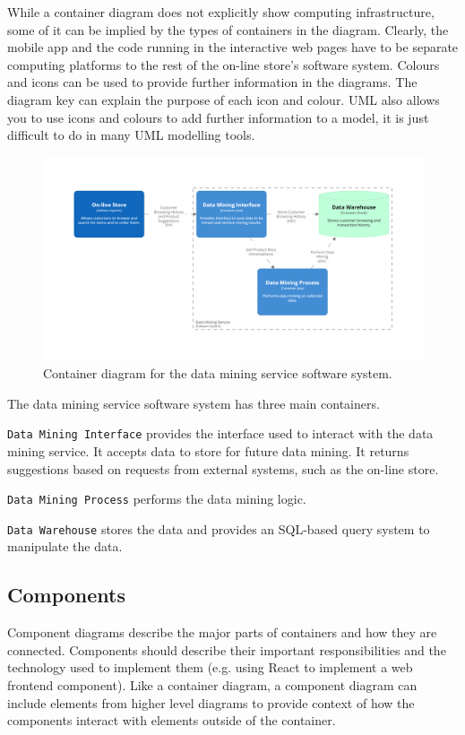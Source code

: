\noindent
While a container diagram does not explicitly show computing infrastructure, some of it can be implied by the types of containers in the diagram.
Clearly, the mobile app and the code running in the interactive web pages have to be separate computing platforms to the rest of the on-line store's software system.
Colours and icons can be used to provide further information in the diagrams.
The diagram key can explain the purpose of each icon and colour.
UML also allows you to use icons and colours to add further information to a model, it is just difficult to do in many UML modelling tools.

\begin{figure}[h]
    \centering
    \begin{adjustwidth}{-5mm}{-5mm}
        \includegraphics[trim=185 185 185 185,clip,width=0.92\paperwidth]{images/c4/datamining_container_diagram.png}
    \end{adjustwidth}
    \caption{Container diagram for the data mining service software system.}
    \label{fig:c4_container_datamining}
\end{figure}

\noindent
The data mining service software system has three main containers.

\texttt{Data Mining Interface} provides the interface used to interact with the data mining service.
It accepts data to store for future data mining.
It returns suggestions based on requests from external systems, such as the on-line store.

\texttt{Data Mining Process} performs the data mining logic.

\texttt{Data Warehouse} stores the data and provides an SQL-based query system to manipulate the data.

\subsection{Components}
Component diagrams describe the major parts of containers and how they are connected.
Components should describe their important responsibilities and the technology used to implement them
(e.g. using React to implement a web frontend component).
Like a container diagram, a component diagram can include elements from higher level diagrams
to provide context of how the components interact with elements outside of the container.

